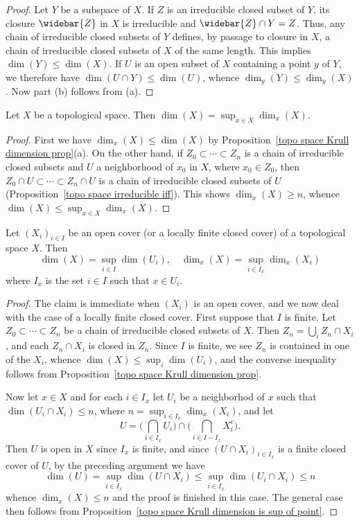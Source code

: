 \begin{proof}
Let $Y$ be a subspace of $X$. If $Z$ is an irreducible closed subset of $Y$, its closure $\widebar{Z}$ in $X$ is irreducible and $\widebar{Z}\cap Y=Z$. Thus, any chain of irreducible closed subsets of $Y$ defines, by passage to closure in $X$, a chain of irreducible closed subsets of $X$ of the same length. This implies $\dim(Y)\leq\dim(X)$. If $U$ is an open subset of $X$ containing a point $y$ of $Y$, we therefore have $\dim(U\cap Y)\leq\dim(U)$, whence $\dim_y(Y)\leq\dim_y(X)$. Now part (b) follows from (a).
\end{proof}
\begin{proposition}\label{topo space Krull dimension is sup of point}
Let $X$ be a topological space. Then $\dim(X)=\sup_{x\in X}\dim_x(X)$.
\end{proposition}
\begin{proof}
First we have $\dim_x(X)\leq\dim(X)$ by Proposition~\ref{topo space Krull dimension prop}(a). On the other hand, if $Z_0\subset\cdots\subset Z_n$ is a chain of irreducible closed subsets and $U$ a neighborhood of $x_0$ in $X$, where $x_0\in Z_0$, then $Z_0\cap U\subset\cdots\subset Z_n\cap U$ is a chain of irreducible closed subsets of $U$ (Proposition~\ref{topo space irreducible iff}). This shows $\dim_x(X)\geq n$, whence $\dim(X)\leq\sup_{x\in X}\dim_x(X)$. 
\end{proof}
\begin{corollary}\label{topo space Krull dimension and cover}
Let $(X_i)_{i\in I}$ be an open cover (or a locally finite closed cover) of a topological space $X$. Then
\[\dim(X)=\sup_{i\in I}\dim(U_i),\quad \dim_x(X)=\sup_{i\in I_x}\dim_x(X_i)\]
where $I_x$ is the set $i\in I$ such that $x\in U_i$. 
\end{corollary}
\begin{proof}
The claim is immediate when $(X_i)$ is an open cover, and we now deal with the case of a locally finite closed cover. First suppose that $I$ is finite. Let $Z_0\subset\cdots\subset Z_n$ be a chain of irreducible closed subsets of $X$. Then $Z_n=\bigcup_iZ_n\cap X_i$, and each $Z_n\cap X_i$ is closed in $Z_n$. Since $I$ is finite, we see $Z_n$ is contained in one of the $X_i$, whence $\dim(X)\leq\sup_i\dim(U_i)$, and the converse inequality follows from Proposition~\ref{topo space Krull dimension prop}.\par
Now let $x\in X$ and for each $i\in I_x$ let $U_i$ be a neighborhod of $x$ such that $\dim(U_i\cap X_i)\leq n$, where $n=\sup_{i\in I_x}\dim_x(X_i)$, and let
\[U=\Big(\bigcap_{i\in I_x}U_i\Big)\cap\Big(\bigcap_{i\in I-I_x}X_i^c\Big).\]
Then $U$ is open in $X$ since $I_x$ is finite, and since $(U\cap X_i)_{i\in I_x}$ is a finite closed cover of $U$, by the preceding argument we have
\[\dim(U)=\sup_{i\in I_x}\dim(U\cap X_i)\leq\sup_{i\in I_x}\dim(U_i\cap X_i)\leq n\]
whence $\dim_x(X)\leq n$ and the proof is finished in this case. The general case then follows from Proposition~\ref{topo space Krull dimension is sup of point}.
\end{proof}
